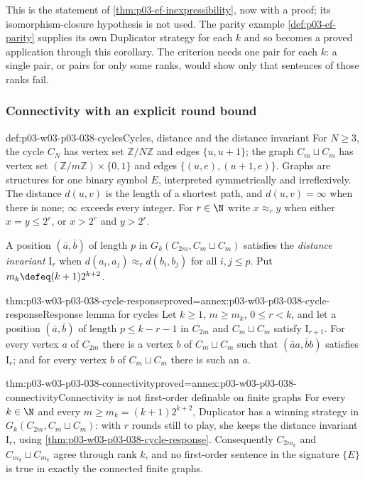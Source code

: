 This is the statement of \cref{thm:p03-ef-inexpressibility}, now with a
proof; its isomorphism-closure hypothesis is not used. The parity example
\cref{def:p03-ef-parity} supplies its own Duplicator strategy for each \(k\)
and so becomes a proved application through this corollary. The criterion
needs one pair for each \(k\): a single pair, or pairs for only some ranks,
would show only that sentences of those ranks fail.

\subsubsection{Connectivity with an explicit round bound}

\begin{hbdefinition}{def:p03-w03-p03-038-cycles}{Cycles, distance and the distance invariant}
For \(N\ge3\), the cycle \(C_N\) has vertex set
\(\mathbb Z/N\mathbb Z\) and edges \(\{u,u+1\}\); the graph
\(C_m\sqcup C_m\) has vertex set
\((\mathbb Z/m\mathbb Z)\times\{0,1\}\) and edges
\(\{(u,e),(u+1,e)\}\). Graphs are structures for one binary symbol \(E\),
interpreted symmetrically and irreflexively. The distance \(d(u,v)\) is
the length of a shortest path, and \(d(u,v)=\infty\) when there is none;
\(\infty\) exceeds every integer. For \(r\in\N\) write
\(x\approx_r y\) when either \(x=y\le2^r\), or \(x>2^r\) and \(y>2^r\).

A position \((\bar a,\bar b)\) of length \(p\) in
\(G_k(C_{2m},C_m\sqcup C_m)\) satisfies the \emph{distance invariant}
\(\mathrm I_r\) when \(d(a_i,a_j)\approx_r d(b_i,b_j)\) for all
\(i,j\le p\). Put \(m_k\defeq(k+1)2^{k+2}\).
\end{hbdefinition}

\begin{hblemma}{thm:p03-w03-p03-038-cycle-response}{proved=annex:p03-w03-p03-038-cycle-response}{Response lemma for cycles}
Let \(k\ge1\), \(m\ge m_k\), \(0\le r<k\), and let a position
\((\bar a,\bar b)\) of length \(p\le k-r-1\) in \(C_{2m}\) and
\(C_m\sqcup C_m\) satisfy \(\mathrm I_{r+1}\). For every vertex \(a\) of
\(C_{2m}\) there is a vertex \(b\) of \(C_m\sqcup C_m\) such that
\((\bar aa,\bar bb)\) satisfies \(\mathrm I_r\); and for every vertex
\(b\) of \(C_m\sqcup C_m\) there is such an \(a\).
\end{hblemma}

\begin{hbtheorem}{thm:p03-w03-p03-038-connectivity}{proved=annex:p03-w03-p03-038-connectivity}{Connectivity is not first-order definable on finite graphs}
For every \(k\in\N\) and every \(m\ge m_k=(k+1)2^{k+2}\), Duplicator has a
winning strategy in \(G_k(C_{2m},C_m\sqcup C_m)\): with \(r\) rounds still
to play, she keeps the distance invariant \(\mathrm I_r\), using
\cref{thm:p03-w03-p03-038-cycle-response}. Consequently \(C_{2m_k}\) and
\(C_{m_k}\sqcup C_{m_k}\) agree through rank \(k\), and no first-order
sentence in the signature \(\{E\}\) is true in exactly the connected finite
graphs.
\end{hbtheorem}

